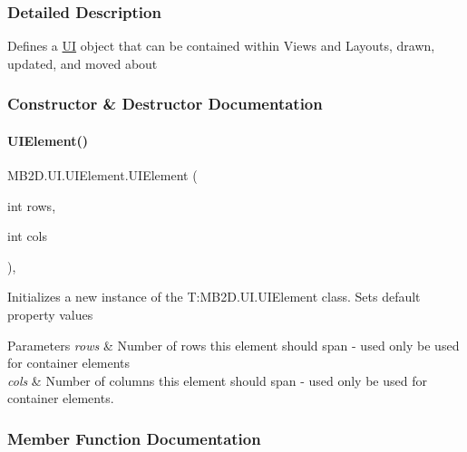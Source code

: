 \subsubsection{Detailed Description}
Defines a \hyperlink{namespace_m_b2_d_1_1_u_i}{UI} object that can be contained within Views and Layouts, drawn, updated, and moved about 



\subsubsection{Constructor \& Destructor Documentation}
\hypertarget{class_m_b2_d_1_1_u_i_1_1_u_i_element_a508bd28173afc58ba1214672a013f802}{}\label{class_m_b2_d_1_1_u_i_1_1_u_i_element_a508bd28173afc58ba1214672a013f802} 
\paragraph{\texorpdfstring{U\+I\+Element()}{UIElement()}}
{\footnotesize\ttfamily M\+B2\+D.\+U\+I.\+U\+I\+Element.\+U\+I\+Element (\begin{DoxyParamCaption}\item[{int}]{rows,  }\item[{int}]{cols }\end{DoxyParamCaption})\hspace{0.3cm}{\ttfamily [inline]}, {\ttfamily [protected]}}



Initializes a new instance of the T\+:\+M\+B2\+D.\+U\+I.\+U\+I\+Element class. Sets default property values 


\begin{DoxyParams}{Parameters}
{\em rows} & Number of rows this element should span -\/ used only be used for container elements \\
\hline
{\em cols} & Number of columns this element should span -\/ used only be used for container elements. \\
\hline
\end{DoxyParams}


\subsubsection{Member Function Documentation}
\hypertarget{class_m_b2_d_1_1_u_i_1_1_u_i_element_afec98e6e38cb0dbc17a5db6d6a3d5ba5}{}\label{class_m_b2_d_1_1_u_i_1_1_u_i_element_afec98e6e38cb0dbc17a5db6d6a3d5ba5} 
